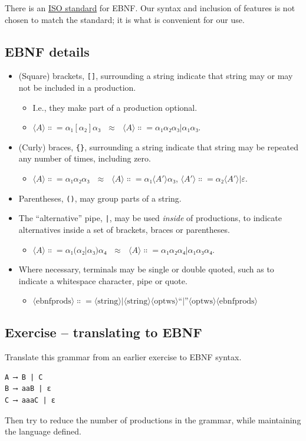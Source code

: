 \documentclass[11pt]{article}
\theoremstyle{definition}
\begin{document}
There is an \href{https://www.iso.org/standard/26153.html}{ISO standard} for EBNF.
Our syntax and inclusion of features is
not chosen to match the standard;
it is what is convenient for our use.

\subsection{EBNF details}
\label{sec:org5d58c0d}
\begin{itemize}
\item (Square) brackets, \texttt{[]}, surrounding a string
indicate that string may or may not be included in a production.
\begin{itemize}
\item I.e., they make part of a production optional.
\item \(⟨A⟩ ∷= α₁ [ α₂ ] α₃ \ \ \ ≈ \ \ \ ⟨A⟩ ∷= α₁ α₂ α₃ | α₁ α₃\).
\end{itemize}
\item (Curly) braces, \texttt{\{\}}, surrounding a string
indicate that string may be repeated any number of times,
including zero.
\begin{itemize}
\item \(⟨A⟩ ∷= α₁ { α₂ } α₃ \ \ \ ≈ \ \ \ ⟨A⟩ ∷= α₁ ⟨A′⟩ α₃\), \(⟨A′⟩ ∷= α₂ ⟨A′⟩ | ε\).
\end{itemize}
\item Parentheses, \texttt{()}, may group parts of a string.
\item The “alternative” pipe, \texttt{|}, may be used \emph{inside} of productions,
to indicate alternatives inside a set of brackets, braces
or parentheses.
\begin{itemize}
\item \(⟨A⟩ ∷= α₁ (α₂ | α₃) α₄ \ \ \ ≈ \ \ \ ⟨A⟩ ∷= α₁ α₂ α₄ | α₁ α₃ α₄\).
\end{itemize}
\item Where necessary, terminals may be single or double quoted,
such as to indicate a whitespace character, pipe or quote.
\begin{itemize}
\item \(⟨\text{ebnfprods}⟩ ∷= ⟨\text{string}⟩ | ⟨\text{string}⟩ ⟨\text{optws}⟩ “|” ⟨\text{optws}⟩ ⟨\text{ebnfprods}⟩\)
\end{itemize}
\end{itemize}

\subsection{Exercise – translating to EBNF}
\label{sec:org497eb63}
Translate this grammar from an earlier exercise to EBNF syntax.
\begin{verbatim}
A ⟶ B | C
B ⟶ aaB | ε
C ⟶ aaaC | ε
\end{verbatim}
Then try to reduce the number of productions in the grammar,
while maintaining the language defined.
\end{document}
